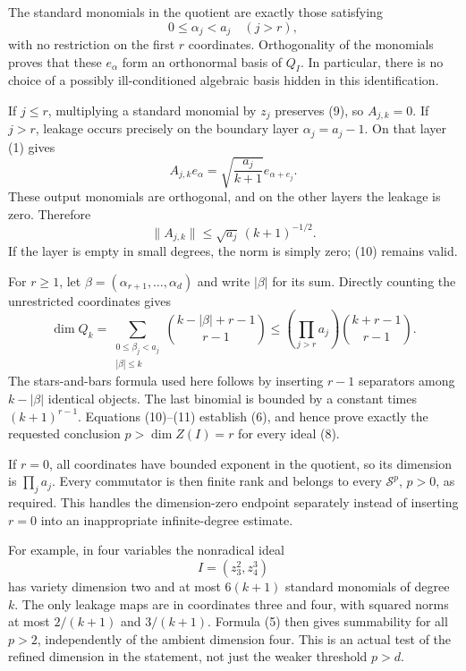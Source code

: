 \documentclass[11pt]{article}
\begin{document}
The standard monomials in the quotient are exactly those satisfying
\[
 0\leq\alpha_j<a_j\quad(j>r),                            \tag{9}
\]
with no restriction on the first $r$ coordinates. Orthogonality of the monomials proves that these $e_\alpha$ form an orthonormal basis of $Q_I$. In particular, there is no choice of a possibly ill-conditioned algebraic basis hidden in this identification.

If $j\leq r$, multiplying a standard monomial by $z_j$ preserves (9), so $A_{j,k}=0$. If $j>r$, leakage occurs precisely on the boundary layer $\alpha_j=a_j-1$. On that layer (1) gives
\[
 A_{j,k}e_\alpha=\sqrt{\frac{a_j}{k+1}}e_{\alpha+e_j}.
\]
These output monomials are orthogonal, and on the other layers the leakage is zero. Therefore
\[
 \|A_{j,k}\|\leq\sqrt{a_j}\,(k+1)^{-1/2}.                \tag{10}
\]
If the layer is empty in small degrees, the norm is simply zero; (10) remains valid.

For $r\geq1$, let $\beta=(\alpha_{r+1},\ldots,\alpha_d)$ and write $|\beta|$ for its sum. Directly counting the unrestricted coordinates gives
\[
 \dim Q_k=
 \sum_{\substack{0\leq\beta_j<a_j\\ |\beta|\leq k}}
 {k-|\beta|+r-1\choose r-1}
 \leq \left(\prod_{j>r}a_j\right){k+r-1\choose r-1}.
                                                               \tag{11}
\]
The stars-and-bars formula used here follows by inserting $r-1$ separators among $k-|\beta|$ identical objects. The last binomial is bounded by a constant times $(k+1)^{r-1}$. Equations (10)--(11) establish (6), and hence prove exactly the requested conclusion $p>\dim Z(I)=r$ for every ideal (8).

If $r=0$, all coordinates have bounded exponent in the quotient, so its dimension is $\prod_j a_j$. Every commutator is then finite rank and belongs to every $\mathcal S^p$, $p>0$, as required. This handles the dimension-zero endpoint separately instead of inserting $r=0$ into an inappropriate infinite-degree estimate.

For example, in four variables the nonradical ideal
\[
 I=(z_3^2,z_4^3)
\]
has variety dimension two and at most $6(k+1)$ standard monomials of degree $k$. The only leakage maps are in coordinates three and four, with squared norms at most $2/(k+1)$ and $3/(k+1)$. Formula (5) then gives summability for all $p>2$, independently of the ambient dimension four. This is an actual test of the refined dimension in the statement, not just the weaker threshold $p>d$.
\end{document}
